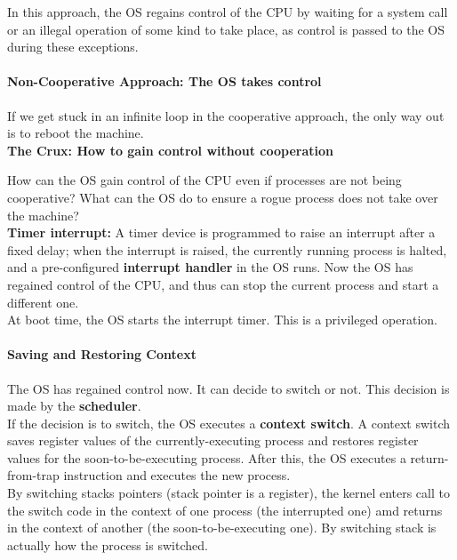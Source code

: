 In this approach, the OS regains control of the CPU by waiting for a 
system call or an illegal operation of some kind to take place, as
control is passed to the OS during these exceptions.

\paragraph{Non-Cooperative Approach: The OS takes control}

If we get stuck in an infinite loop in the cooperative approach, the only way
out is to reboot the machine.\\

\textbf{The Crux: How to gain control without cooperation} 

How can the OS gain control of the CPU even if processes are not being
cooperative? What can the OS do to ensure a rogue process does not take over
the machine?\\

\textbf{Timer interrupt:} A timer device is programmed to raise an interrupt
after a fixed delay; when the interrupt is raised, the currently running
process is halted, and a pre-configured \textbf{interrupt handler} in the OS
runs. Now the OS has regained control of the CPU, and thus can stop the 
current process and start a different one.\\

At boot time, the OS starts the interrupt timer. This is a privileged
operation.

\paragraph{Saving and Restoring Context}

The OS has regained control now. It can decide to switch or not. This decision
is made by the \textbf{scheduler}.\\

If the decision is to switch, the OS executes a \textbf{context switch}. A
context switch saves register values of the currently-executing process and
restores register values for the soon-to-be-executing process. After this, 
the OS executes a return-from-trap instruction and executes the new process.\\

By switching stacks pointers (stack pointer is a register),
the kernel enters call to the switch code in the 
context of one process (the interrupted one) amd returns in the context of
another (the soon-to-be-executing one). By switching stack is actually how the
process is switched.\\

